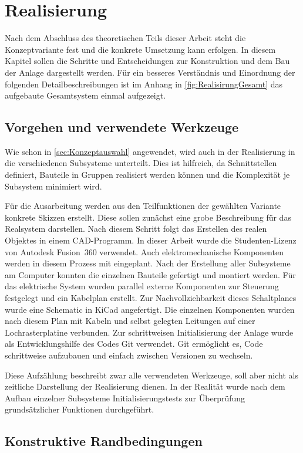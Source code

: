 \section{Realisierung}\label{sec:Realisierung}
Nach dem Abschluss des theoretischen Teils dieser Arbeit steht die Konzeptvariante fest und die konkrete Umsetzung kann erfolgen.
In diesem Kapitel sollen die Schritte und Entscheidungen zur Konstruktion und dem Bau der Anlage dargestellt werden. Für ein besseres
Verständnis und Einordnung der folgenden Detailbeschreibungen ist im Anhang in \cref{fig:RealisirungGesamt} das aufgebaute
Gesamtsystem einmal aufgezeigt.
%
%
\subsection{Vorgehen und verwendete Werkzeuge}\label{sec:VerwendeteTools}
%
Wie schon in \cref{sec:Konzeptauswahl} angewendet, wird auch in der Realisierung in die verschiedenen Subsysteme unterteilt.
Dies ist hilfreich, da Schnittstellen definiert, Bauteile in Gruppen realisiert werden können und die Komplexität
je Subsystem minimiert wird.

Für die Ausarbeitung werden aus den Teilfunktionen der gewählten Variante konkrete Skizzen erstellt. Diese sollen zunächst eine
grobe Beschreibung für das Realsystem darstellen. Nach diesem Schritt folgt das Erstellen des realen Objektes in einem CAD-Programm.
In dieser Arbeit wurde die Studenten-Lizenz
von Autodesk Fusion~360 verwendet. Auch elektromechanische Komponenten werden in diesem Prozess mit eingeplant. Nach der
Erstellung aller Subsysteme am Computer konnten die einzelnen Bauteile gefertigt und montiert werden. Für das
elektrische System wurden parallel externe Komponenten zur Steuerung festgelegt und ein Kabelplan erstellt. Zur Nachvollziehbarkeit
dieses Schaltplanes wurde eine Schematic in KiCad angefertigt. Die einzelnen Komponenten wurden nach diesem Plan
mit Kabeln und selbst gelegten Leitungen auf einer Lochrasterplatine verbunden. Zur schrittweisen Initialisierung der Anlage wurde
als Entwicklungshilfe des Codes Git verwendet. Git ermöglicht es, Code schrittweise aufzubauen und einfach zwischen Versionen
zu wechseln.

Diese Aufzählung beschreibt zwar alle verwendeten Werkzeuge, soll aber nicht als zeitliche Darstellung der Realisierung dienen.
In der Realität wurde nach dem Aufbau einzelner Subsysteme Initialisierungstests zur Überprüfung grundsätzlicher Funktionen durchgeführt.
%
%

\subsection{Konstruktive Randbedingungen}\label{sec:Randbedingungen}

